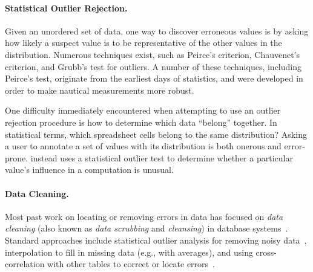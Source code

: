 
\paragraph{Statistical Outlier Rejection.}
Given an unordered set of data, one way to discover erroneous values is by asking how likely a suspect value is to be representative of the other values in the distribution.  Numerous techniques exist, such as Peirce's criterion, Chauvenet's criterion, and Grubb's test for outliers.  A number of these techniques, including Peirce's test, originate from the earliest days of statistics, and were developed in order to make nautical measurements more robust.

One difficulty immediately encountered when attempting to use an outlier rejection procedure is how to determine which data ``belong'' together.  In statistical terms, which spreadsheet cells belong to the same distribution?  Asking a user to annotate a set of values with its distribution is both onerous and error-prone.  \checkcell instead uses a statistical outlier test to determine whether a particular value's influence in a computation is unusual.

\paragraph{Data Cleaning.}
Most past work on locating or removing errors in data has focused
on \emph{data cleaning} (also known as \emph{data scrubbing}
and \emph{cleansing}) in database
systems~\cite{DBLP:journals/debu/RahmD00,han2006data}. Standard
approaches include statistical outlier analysis for removing noisy
data~\cite{1583581}, interpolation to fill in missing data (e.g., with
averages), and using cross-correlation with other tables to correct or
locate errors~\cite{Hernandez:1995:MPL:223784.223807}.




